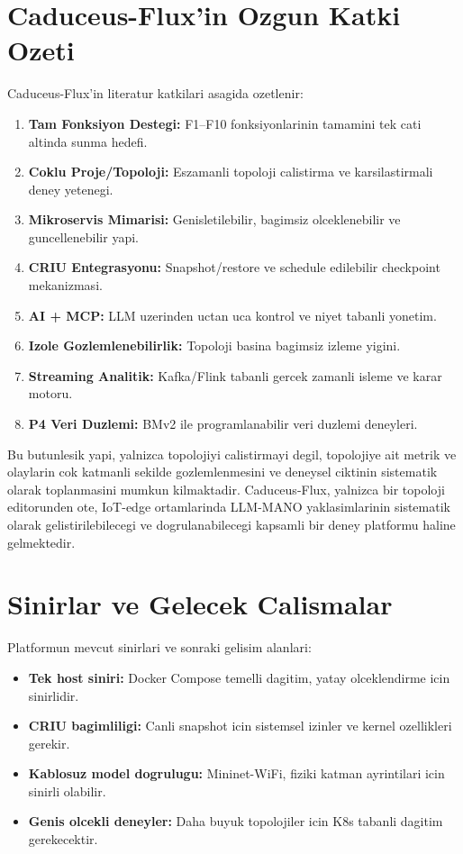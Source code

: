 \documentclass[conference]{IEEEtran}
\begin{document}
\section{Caduceus-Flux'in Ozgun Katki Ozeti}
Caduceus-Flux'in literatur katkilari asagida ozetlenir:
\begin{enumerate}
\item \textbf{Tam Fonksiyon Destegi:} F1--F10 fonksiyonlarinin tamamini tek cati altinda sunma hedefi.
\item \textbf{Coklu Proje/Topoloji:} Eszamanli topoloji calistirma ve karsilastirmali deney yetenegi.
\item \textbf{Mikroservis Mimarisi:} Genisletilebilir, bagimsiz olceklenebilir ve guncellenebilir yapi.
\item \textbf{CRIU Entegrasyonu:} Snapshot/restore ve schedule edilebilir checkpoint mekanizmasi.
\item \textbf{AI + MCP:} LLM uzerinden uctan uca kontrol ve niyet tabanli yonetim.
\item \textbf{Izole Gozlemlenebilirlik:} Topoloji basina bagimsiz izleme yigini.
\item \textbf{Streaming Analitik:} Kafka/Flink tabanli gercek zamanli isleme ve karar motoru.
\item \textbf{P4 Veri Duzlemi:} BMv2 ile programlanabilir veri duzlemi deneyleri.
\end{enumerate}

Bu butunlesik yapi, yalnizca topolojiyi calistirmayi degil, topolojiye ait metrik ve olaylarin cok katmanli sekilde gozlemlenmesini ve deneysel ciktinin sistematik olarak toplanmasini mumkun kilmaktadir. Caduceus-Flux, yalnizca bir topoloji editorunden ote, IoT-edge ortamlarinda LLM-MANO yaklasimlarinin sistematik olarak gelistirilebilecegi ve dogrulanabilecegi kapsamli bir deney platformu haline gelmektedir.

\section{Sinirlar ve Gelecek Calismalar}
Platformun mevcut sinirlari ve sonraki gelisim alanlari:
\begin{itemize}
\item \textbf{Tek host siniri:} Docker Compose temelli dagitim, yatay olceklendirme icin sinirlidir.
\item \textbf{CRIU bagimliligi:} Canli snapshot icin sistemsel izinler ve kernel ozellikleri gerekir.
\item \textbf{Kablosuz model dogrulugu:} Mininet-WiFi, fiziki katman ayrintilari icin sinirli olabilir.
\item \textbf{Genis olcekli deneyler:} Daha buyuk topolojiler icin K8s tabanli dagitim gerekecektir.
\end{itemize}
\end{document}
